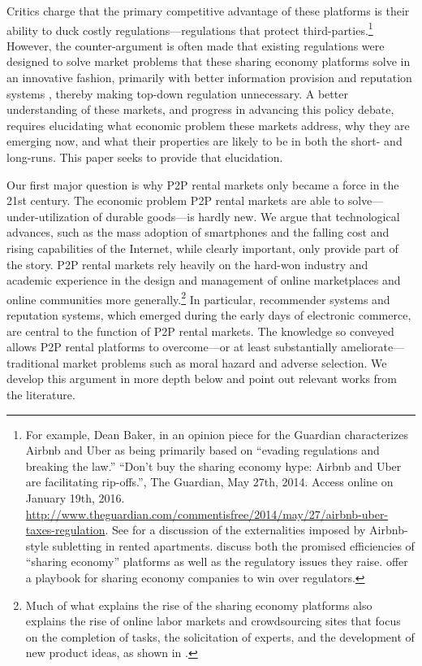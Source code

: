 \documentclass[12pt]{article}
\begin{document}
Critics charge that the primary competitive advantage of these platforms is their ability to duck costly regulations---regulations that protect third-parties.\footnote{
  For example, Dean Baker, in an opinion piece for the Guardian characterizes Airbnb and Uber as being primarily based on ``evading regulations and breaking the law.''
  ``Don't buy the sharing economy hype: Airbnb and Uber are facilitating rip-offs.'', The Guardian, May 27th, 2014. Access online on January 19th, 2016.
  \url{http://www.theguardian.com/commentisfree/2014/may/27/airbnb-uber-taxes-regulation}. 
  See \cite{filippas2016tragedy} for a discussion of the externalities imposed by Airbnb-style subletting in rented apartments.
  \cite{edelman2015efficiencies} discuss both the promised efficiencies of ``sharing economy'' platforms as well as the regulatory issues they raise.
  \cite{cannon2014uber} offer a playbook for sharing economy companies to win over regulators.
}   
However, the counter-argument is often made that existing regulations
were designed to solve market problems that these sharing economy platforms solve in an innovative fashion, primarily with better information provision and reputation systems \citep{koopman2014sharing}, thereby making top-down regulation unnecessary.  
A better understanding of these markets, and progress in advancing this policy debate, requires elucidating what economic problem these markets address, why they are emerging now, and what their properties are likely to be in both the short- and long-runs. 
This paper seeks to provide that elucidation. 

Our first major question is why P2P rental markets only became a force in the 21st century. 
The economic problem P2P rental markets are able to solve---under-utilization of durable goods---is hardly new.  
We argue that technological advances, such as the mass adoption of smartphones and the falling cost and rising capabilities of the Internet, while clearly important, only provide part of the story. 
P2P rental markets rely heavily on the hard-won industry and academic experience in the design and management of online marketplaces and online communities more generally.\footnote{
  Much of what explains the rise of the sharing economy platforms also explains the rise of online labor markets and crowdsourcing sites that focus on the completion of tasks, the solicitation of experts, and the development of new product ideas, as shown in \cite{huang2014crowdsourcing}.  
}
In particular, recommender systems and reputation systems, which emerged during the early days of electronic commerce, are central to the function of P2P rental markets. 
The knowledge so conveyed allows P2P rental platforms to overcome---or at least substantially ameliorate---traditional market problems such as moral hazard and adverse selection.  
We develop this argument in more depth below and point out relevant works from the literature. 
\end{document}
